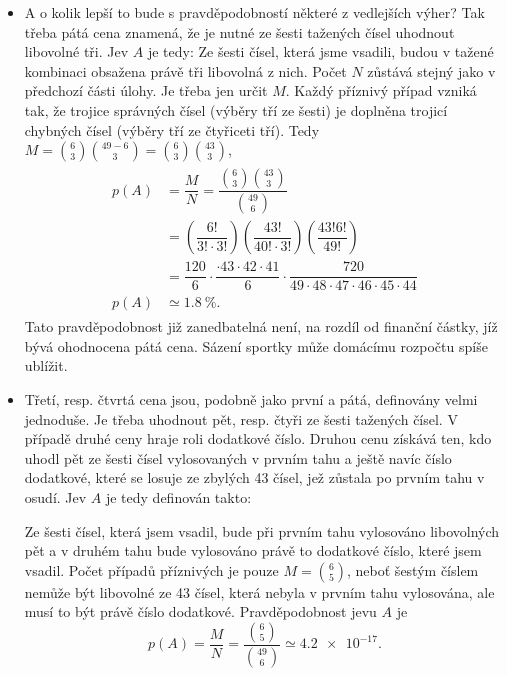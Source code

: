 \begin{mdframed}[style=mdexam]
\begin{example}
\begin{itemize}[leftmargin=10pt,noitemsep]
      \item A o kolik lepší to bude s pravděpodobností některé z vedlejších výher? Tak třeba pátá
            cena znamená, že je nutné ze šesti tažených čísel uhodnout libovolné tři. Jev \(A\) je
            tedy: Ze šesti čísel, která jsme vsadili, budou v tažené kombinaci obsažena právě tři
            libovolná z nich. Počet \(N\) zůstává stejný jako v předchozí části úlohy. Je třeba jen
            určit \(M\). Každý příznivý případ vzniká tak, že trojice správných čísel (výběry tří ze
            šesti) je doplněna trojicí chybných čísel (výběry tří ze čtyřiceti tří). Tedy \(M = 
            \binom{6}{3}\binom{49 - 6}{3} = \binom{6}{3}\binom{43}{3}\),
            \begin{gather*}
              \begin{align*}
              p(A) &= \dfrac{M}{N} 
                    = \dfrac{\binom{6}{3}\binom{43}{3}}{\binom{49}{6}}                           \\              
                   &= \left(\dfrac{6!}{3!\cdot3!}\right)\left(\dfrac{43!}{40!\cdot3!}\right)
                      \left(\dfrac{43!6!}{49!}\right)                                            \\
                   &= \dfrac{120}{6}\cdot\dfrac{\cdot43\cdot42\cdot41}{6}\cdot
				      \dfrac{720}{49\cdot48\cdot47\cdot46\cdot45\cdot44}                                 \\
              p(A) &\simeq\SI{1.8}{\percent}.
              \end{align*}    
            \end{gather*}
            Tato pravděpodobnost již zanedbatelná není, na rozdíl od finanční částky, jíž bývá
            ohodnocena pátá cena. Sázení sportky může domácímu rozpočtu spíše ublížit.
      \item Třetí, resp. čtvrtá cena jsou, podobně jako první a pátá, definovány velmi jednoduše. Je
            třeba uhodnout pět, resp. čtyři ze šesti tažených čísel. V případě druhé ceny hraje roli
            dodatkové číslo. Druhou cenu získává ten, kdo uhodl pět ze šesti čísel vylosovaných v
            prvním tahu a ještě navíc číslo dodatkové, které se losuje ze zbylých \num{43} čísel,
            jež zůstala po prvním tahu v osudí. Jev \(A\) je tedy definován takto:
            
            Ze šesti čísel, která jsem vsadil, bude při prvním tahu vylosováno libovolných pět a v
            druhém tahu bude vylosováno právě to dodatkové číslo, které jsem vsadil. Počet případů
            příznivých je pouze \(M = \binom{6}{5}\), neboť šestým číslem nemůže být libovolné ze
            \num{43} čísel, která nebyla v prvním tahu vylosována, ale musí to být právě číslo
            dodatkové. Pravděpodobnost jevu \(A\) je
            \begin{equation*}
              p(A) = \dfrac{M}{N} = \dfrac{\binom{6}{5}}{\binom{49}{6}} \simeq\num{4.2e-17}.
            \end{equation*}
            

\end{itemize}
\end{example}
\end{mdframed}
